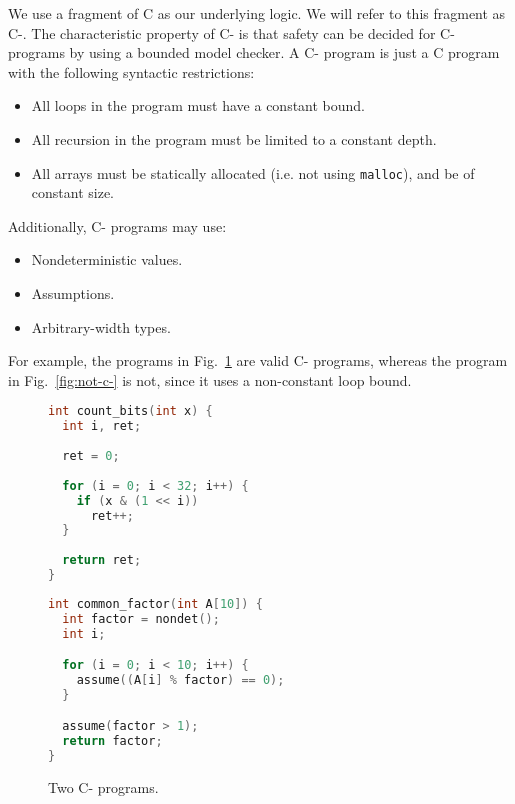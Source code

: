 \documentclass[a4paper]{llncs}
\begin{document}
We use a fragment of C as our underlying logic.  We will refer to this fragment
as C-.  The characteristic property of C- is that safety can be decided for
C- programs by using a bounded model checker.  A C- program is just a C program
with the following syntactic restrictions:

\begin{itemize}
 \item All loops in the program must have a constant bound.
 \item All recursion in the program must be limited to a constant depth.
 \item All arrays must be statically allocated (i.e. not using \texttt{malloc}),
 and be of constant size.
\end{itemize}

Additionally, C- programs may use:

\begin{itemize}
 \item Nondeterministic values.
 \item Assumptions.
 \item Arbitrary-width types.
\end{itemize}

For example, the programs in Fig.~\ref{fig:c-} are valid
C- programs, whereas the program in Fig.~\ref{fig:not-c-} is not, since it uses
a non-constant loop bound.

\begin{figure}
\begin{minipage}[scale=0.8]{0.45\linewidth}
 \begin{lstlisting}[language=c]
int count_bits(int x) {
  int i, ret;
  
  ret = 0;
  
  for (i = 0; i < 32; i++) {
    if (x & (1 << i))
      ret++;
  }
  
  return ret;
}
 \end{lstlisting}
\end{minipage}
\begin{minipage}{0.54\linewidth}
 \begin{lstlisting}[language=C]
int common_factor(int A[10]) {
  int factor = nondet();
  int i;

  for (i = 0; i < 10; i++) {
    assume((A[i] % factor) == 0);
  }

  assume(factor > 1);
  return factor;
}

 \end{lstlisting}
\end{minipage}

 \label{fig:c-}
 \caption{Two C- programs.}
\end{figure}
\end{document}
